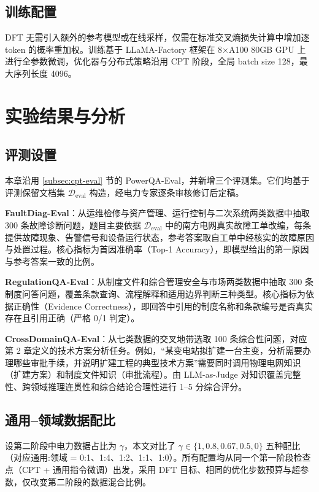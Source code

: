 \documentclass[fontset=fandol,type=master,campus=shenzhen,etitleauto=true]{hithesisbook}
\begin{document}
\subsection{训练配置}\label{subsec:sft-config}

DFT 无需引入额外的参考模型或在线采样，仅需在标准交叉熵损失计算中增加逐 token 的概率重加权。训练基于 LLaMA-Factory 框架在 8×A100 80GB GPU 上进行全参数微调，优化器与分布式策略沿用 CPT 阶段，全局 batch size 128，最大序列长度 4096。

\section{实验结果与分析}\label{sft-ux8badux7ec3ux4e0eux5b9eux9a8cux7ed3ux679c}

\subsection{评测设置}\label{subsec:sft-eval}

本章沿用 \ref{subsec:cpt-eval} 节的 PowerQA-Eval，并新增三个评测集。它们均基于评测保留文档集 $\mathcal{D}_{\text{eval}}$ 构造，经电力专家逐条审核修订后定稿。

\textbf{FaultDiag-Eval}：从运维检修与资产管理、运行控制与二次系统两类数据中抽取 300 条故障诊断问题，题目主要依据 $\mathcal{D}_{\text{eval}}$ 中的南方电网真实故障工单改编，每条提供故障现象、告警信号和设备运行状态，参考答案取自工单中经核实的故障原因与处置过程。核心指标为首因准确率（Top-1 Accuracy），即模型给出的第一原因与参考答案一致的比例。

\textbf{RegulationQA-Eval}：从制度文件和综合管理安全与市场两类数据中抽取 300 条制度问答问题，覆盖条款查询、流程解释和适用边界判断三种类型。核心指标为依据正确性（Evidence Correctness），即回答中引用的制度名称和条款编号是否真实存在且引用正确（严格 0/1 判定）。

\textbf{CrossDomainQA-Eval}：从七类数据的交叉地带选取 100 条综合性问题，对应第 2 章定义的技术方案分析任务。例如，“某变电站拟扩建一台主变，分析需要办理哪些审批手续，并说明扩建工程的典型技术方案”需要同时调用物理电网知识（扩建方案）和制度文件知识（审批流程）。由 LLM-as-Judge 对知识覆盖完整性、跨领域推理连贯性和综合结论合理性进行 1--5 分综合评分。
\subsection{通用--领域数据配比}\label{subsec:sft-ratio}

设第二阶段中电力数据占比为 $\gamma$，本文对比了 $\gamma \in \{1, 0.8, 0.67, 0.5, 0\}$ 五种配比（对应通用:领域 = 0:1、1:4、1:2、1:1、1:0）。所有配置均从同一个第一阶段检查点（CPT + 通用指令微调）出发，采用 DFT 目标、相同的优化步数预算与超参数，仅改变第二阶段的数据混合比例。
\end{document}
